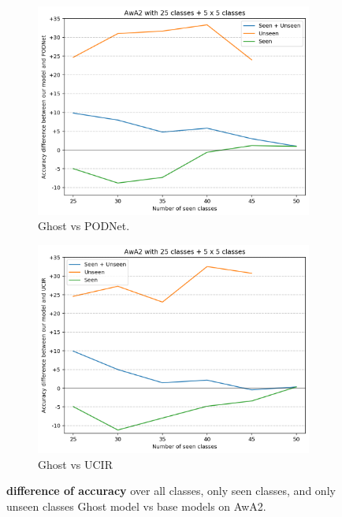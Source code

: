 \begin{figure}
    \centering
    \begin{subfigure}{0.45\linewidth}
        \centering
        \includegraphics[width=\linewidth]{images/ghost/plot_awa2_25x5x5c_podnet_diff.png}
        \caption{Ghost vs PODNet.}
    \end{subfigure}
    \begin{subfigure}{0.45\linewidth}
        \centering
        \includegraphics[width=\linewidth]{images/ghost/plot_awa2_25x5x5c_ucir_diff.png}
        \caption{Ghost vs UCIR}
    \end{subfigure}
    \caption{\textbf{difference of accuracy} over all classes, only seen classes, and only unseen
        classes Ghost model vs base models on AwA2.}
    \label{fig:ghost_plot_awa2_25x5x5c}
\end{figure}
